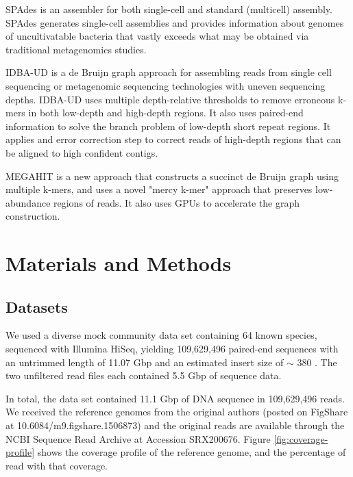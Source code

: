 SPAdes \cite{spades} is an assembler for both single-cell and standard (multicell) assembly. SPAdes generates single-cell assemblies and provides information about genomes of uncultivatable bacteria that vastly exceeds what may be obtained via traditional metagenomics studies. 

IDBA-UD \cite{idba} is a de Bruijn graph approach for assembling reads from single cell sequencing or metagenomic sequencing technologies with uneven sequencing depths. IDBA-UD uses multiple depth-relative thresholds to remove erroneous k-mers in both low-depth and high-depth regions. It also uses paired-end information  to solve the branch problem of low-depth short repeat regions. It applies and error correction step to correct reads of high-depth regions that can be aligned to high confident contigs.

MEGAHIT \cite{megahit} is a new approach that constructs a succinct de Bruijn graph using multiple k-mers, and uses a novel "mercy k-mer" approach that preserves low-abundance regions of reads. It also uses GPUs to accelerate the graph construction.
 

\section*{Materials and Methods}

\subsection*{Datasets}

We used a diverse mock community data set containing 64 known species,
sequenced with Illumina HiSeq, yielding 109,629,496 paired-end sequences with
an untrimmed length of 11.07 Gbp and an estimated insert size of $\sim$ 380
\cite{podar}.  The two unfiltered read files each contained 5.5 Gbp of
sequence data. %


In total, the data set contained 11.1 Gbp of DNA sequence in 109,629,496
reads.  We received the reference genomes from the original authors
(posted on FigShare at 10.6084/m9.figshare.1506873) and the original reads are available through
the NCBI Sequence Read Archive at Accession SRX200676. Figure \ref{fig:coverage-profile} shows the coverage profile of the reference genome, and the percentage of read with that coverage.  


